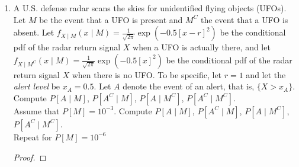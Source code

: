 \documentclass[paper=usletter, fontsize=12pt]{article}
\begin{document}
\begin{enumerate}
\begin{proof}
            And,
            \begin{align*}
                f_Y(y) & = \int_{\infty}f_{X,Y}(x,y)\diff{x}\\
                & = \int_{\infty}f_{Y \mid X}(y \mid x)f_X(x)\diff{x}\\
                & = \int_{-1}^{1}\frac{1}{2}\frac{1}{\sqrt{2\pi\sigma^2}}\exp\Big(\frac{-(y-x)^2}{2\sigma^2}\Big)\diff{x}\\
                & = \frac{1}{2}\bigg(\phi\Big(\frac{y-1}{\sigma}\Big)-\phi\Big(\frac{y+1}{\sigma}\Big)\bigg)
            \end{align*}
            \endgroup

            Therefore,
            \begin{align*}
                f_{X \mid Y}(x \mid y) & = \frac{f_{Y \mid X}(y \mid x)f_X(x)}{f_Y(y)}\\
                & = \frac{\frac{1}{\sqrt{2\pi\sigma^2}}\exp\Big(\frac{-(y-x)^2}{2\sigma^2}\Big)f_X(x)}{\phi\Big(\frac{y-1}{\sigma}\Big)-\phi\Big(\frac{y+1}{\sigma}\Big)} \qedhere
            \end{align*}
            \endgroup

        \end{proof}

        \item A U.S. defense radar scans the skies for unidentified flying
        objects (UFOs). Let $M$ be the event that a UFO is present and $M^C$
        the event that a UFO is absent. Let $f_{X \mid M}(x \mid
        M)=\frac{1}{\sqrt{2\pi}}\exp(-0.5[x-r]^2)$ be the conditional pdf of
        the radar return signal $X$ when a UFO is actually there, and let $f_{X
        \mid M^C}(x \mid M)=\frac{1}{\sqrt{2\pi}}\exp(-0.5[x]^2)$ be the
        conditional pdf of the radar return signal $X$ when there is no UFO. To
        be specific, let $r=1$ and let the \textit{alert level} be $x_A=0.5$.
        Let $A$ denote the event of an alert, that is, $\{X>x_A\}$. Compute
        $P[A\mid M]$, $P[A^C\mid M]$, $P[A\mid M^C]$, $P[A^C\mid M^C]$.\\
        Assume that $P[M]=10^{-3}$. Compute $P[A\mid M]$, $P[A^C\mid M]$,
        $P[A\mid M^C]$, $P[A^C\mid M^C]$.\\
        Repeat for $P[M]=10^{-6}$
        \begin{proof}
        \end{proof}

    \end{enumerate}
\end{document}
